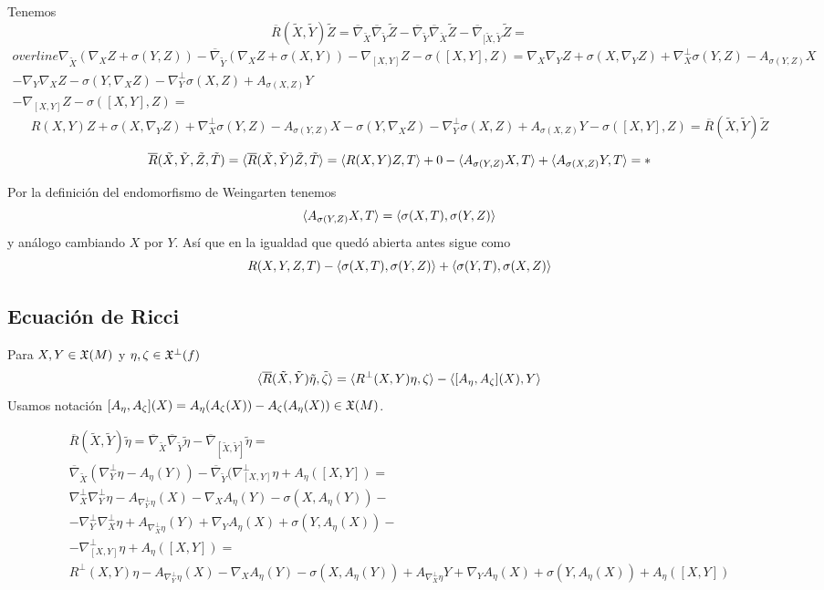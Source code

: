 \documentclass[GSR.tex]{subfiles}
\begin{document}
Tenemos 
$$\overline{R}(\tilde{X},\tilde{Y})\tilde{Z}=\overline{\nabla}_{\tilde{X}}\overline{\nabla}_{\tilde{Y}}\tilde{Z}-\overline{\nabla}_{\tilde{Y}}\overline{\nabla}_{\tilde{X}}\tilde{Z}-\overline{\nabla}_{[\tilde{X},\tilde{Y}}\tilde{Z}=$$
\begin{gather*}
overline{\nabla}_{\tilde{X}}(\nabla_XZ+\sigma(Y,Z))-\overline{\nabla}_{\tilde{Y}}(\nabla_XZ+\sigma(X,Y))-\nabla_{[X,Y]}Z-\sigma([X,Y],Z)=\nabla_X\nabla_YZ+\sigma(X,\nabla_YZ)+\nabla^\perp_X\sigma(Y,Z)-A_{\sigma(Y,Z)}X\\
-\nabla_Y\nabla_XZ-\sigma(Y,\nabla_XZ)-\nabla_Y^\perp\sigma(X,Z)+A_{\sigma(X,Z)}Y\\
-\nabla_{[X,Y]}Z-\sigma([X,Y],Z)=
\end{gather*}
\begin{equation}\label{A}
R(X,Y)Z+\sigma(X,\nabla_YZ)+\nabla_X^\perp\sigma(Y,Z)-A_{\sigma(Y,Z)}X-\sigma(Y,\nabla_XZ)-\nabla_Y^\perp\sigma(X,Z)+A_{\sigma(X,Z)}Y-\sigma([X,Y],Z)=\overline{R}(\tilde{X},\tilde{Y})\tilde{Z}
\end{equation}

\[
\overline{R}(\tilde{X},\tilde{Y},\tilde{Z},\tilde{T})=\langle{\overline{R}(\tilde{X},\tilde{Y})\tilde{Z},\tilde{T}}\rangle=\langle{R(X,Y)Z,T}\rangle+0-\langle{A_{\sigma(Y,Z)}X,T}\rangle+\langle{A_{\sigma(X,Z)}Y,T}\rangle=\ast
\]

Por la definición del endomorfismo de Weingarten tenemos
\[
\langle{A_{\sigma(Y,Z)}X,T}\rangle=\langle{\sigma(X,T),\sigma(Y,Z)}\rangle
\]
y análogo cambiando $X$ por $Y$. Así que en la igualdad que quedó abierta antes sigue como
\[
R(X,Y,Z,T)-\langle{\sigma(X,T),\sigma(Y,Z)}\rangle+\langle{\sigma(Y,T),\sigma(X,Z)}\rangle
\]

\subsection{Ecuación de Ricci}

Para $X,Y\in{\mathfrak{X}}(M)$ y $\eta,\zeta\in{\mathfrak{X}}^\perp(f)$
\[
\langle{\overline{R}(\tilde{X},\tilde{Y})\tilde{\eta},\tilde{\zeta}}\rangle=\langle{R^\perp(X,Y)\eta,\zeta}\rangle-\langle{[A_\eta,A_\zeta](X),Y}\rangle
\]
Usamos notación $[A_\eta,A_\zeta](X)=A_\eta(A_\zeta(X))-A_\zeta(A_\eta(X))\in{\mathfrak{X}}(M)$.

\begin{gather*}
\overline{R}(\tilde{X},\tilde{Y})\tilde{\eta}=\overline{\nabla}_{\tilde{X}}\overline{\nabla}_{\tilde{Y}}\tilde{\eta}-\overline{\nabla}_{[\tilde{X},\tilde{Y}]}\tilde{\eta}=\\
\overline{\nabla}_{\tilde{X}}(\nabla_Y^\perp\eta-A_\eta(Y))-\overline{\nabla}_{\tilde{Y}}(\nabla^\perp_{[X,Y]}\eta+A_{\eta}([X,Y])=\\
\nabla^\perp_X\nabla_Y^\perp\eta-A_{\nabla^\perp_Y\eta}(X)-\nabla_XA_\eta(Y)-\sigma(X,A_\eta(Y))-\\
-\nabla_Y^\perp\nabla_X^\perp\eta+A_{\nabla_X^\perp\eta}(Y)+\nabla_YA_\eta(X)+\sigma(Y,A_\eta(X))-\\
-\nabla^\perp_{[X,Y]}\eta+A_\eta([X,Y])=\\
R^\perp(X,Y)\eta-A_{\nabla^\perp_Y\eta}(X)-\nabla_XA_\eta(Y)-\sigma(X,A_\eta(Y))+A_{\nabla^\perp_X\eta}Y+\nabla_YA_\eta(X)+\sigma(Y,A_\eta(X))+A_\eta([X,Y])
\end{gather*}
\end{document}
